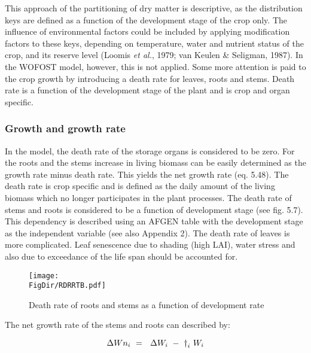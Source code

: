 This approach of the partitioning of dry matter is descriptive, as the distribution keys are
defined as a function of the development stage of the crop only. The influence of
environmental factors could be included by applying modification factors to these keys,
depending on temperature, water and nutrient status of the crop, and its reserve level
(Loomis {\it et al.}, 1979; van Keulen \& Seligman, 1987). In the WOFOST model, however,
this is not applied. Some more attention is paid to the crop growth by introducing a death
rate for leaves, roots and stems. Death rate is a function of the development stage of the
plant and is crop and organ specific.

\subsubsection{Growth and growth rate}
In the model, the death rate of the storage organs is considered to be zero. For the roots
and the stems increase in living biomass can be easily determined as the growth rate
minus death rate. This yields the net growth rate (eq. 5.48). The death rate is crop
specific and is defined as the daily amount of the living biomass which no longer
participates in the plant processes. The death rate of stems and roots is considered to be a
function of development stage (see fig. 5.7). This dependency is described using an
AFGEN table with the development stage as the independent variable (see also Appendix
2). The death rate of leaves is more complicated. Leaf senescence due to shading (high
LAI), water stress and also due to exceedance of the life span should be accounted for.


\begin{figure}[p]
\centering
\texttt{[image: \\FigDir/RDRRTB.pdf]}
\caption{Death rate of roots and stems as a function of development rate}
\label{fig:DeathRoots}
\end{figure}


The net growth rate of the stems and roots can described by:

\begin{equation}
\Delta Wn _{i~} =~\,\,\Delta W _{i~} -~ {\rm \dag } _{i} \,\, W _{i} 
\end{equation}

